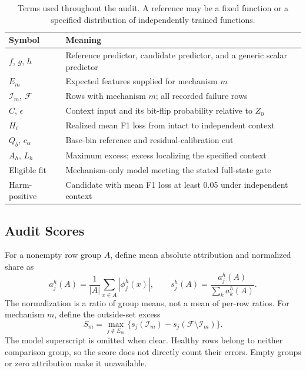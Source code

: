 \documentclass[conference]{IEEEtran}
\begin{document}
\begin{table}[t]
\centering
\caption{Terms used throughout the audit. A reference may be a fixed function or a specified distribution of independently trained functions.}
\label{tab:notation}
\footnotesize
\begin{tabular}{L{0.14\columnwidth}L{0.76\columnwidth}}
\toprule
Symbol & Meaning \\
\midrule
$f$, $g$, $h$ & Reference predictor, candidate predictor, and a generic scalar predictor \\
$E_m$ & Expected features supplied for mechanism $m$ \\
$\mathcal I_m$, $\mathcal F$ & Rows with mechanism $m$; all recorded failure rows \\
$C$, $\epsilon$ & Context input and its bit-flip probability relative to $Z_0$ \\
$H_i$ & Realized mean F1 loss from intact to independent context \\
$Q_b$, $c_\alpha$ & Base-bin reference and residual-calibration cut \\
$A_h$, $L_h$ & Maximum excess; excess localizing the specified context \\
Eligible fit & Mechanism-only model meeting the stated full-state gate \\
Harm-positive & Candidate with mean F1 loss at least 0.05 under independent context \\
\bottomrule
\end{tabular}
\end{table}

\subsection{Audit Scores}
For a nonempty row group $A$, define mean absolute attribution and normalized share as
\begin{equation}
 a_j^h(A)=\frac{1}{|A|}\sum_{x\in A}|\phi_j^h(x)|,
 \qquad s_j^h(A)=\frac{a_j^h(A)}{\sum_k a_k^h(A)}.
\end{equation}
The normalization is a ratio of group means, not a mean of per-row ratios. For mechanism $m$, define the outside-set excess
\begin{equation}
 S_m=\max_{j\notin E_m}\{s_j(\mathcal I_m)-s_j(\mathcal F\setminus\mathcal I_m)\}.
 \label{eq:outside}
\end{equation}
The model superscript is omitted when clear. Healthy rows belong to neither comparison group, so the score does not directly count their errors. Empty groups or zero attribution make it unavailable.
\end{document}
